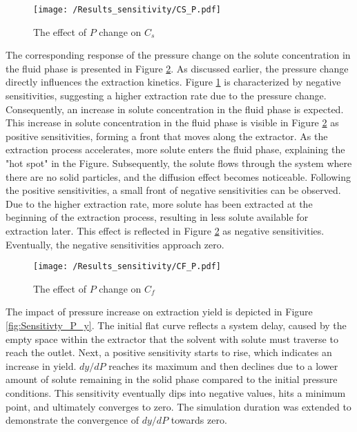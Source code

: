 \documentclass[../Article_Model_Parameters.tex]{subfiles}
\begin{document}
	\begin{figure}[h!]
		\centering
		\texttt{[image: /Results\_sensitivity/CS\_P.pdf]}
		\caption{The effect of $P$ change on $C_s$}
		\label{fig:Sensitivty_P_CS}
	\end{figure}

	The corresponding response of the pressure change on the solute concentration in the fluid phase is presented in Figure \ref{fig:Sensitivty_P_CF}. As discussed earlier, the pressure change directly influences the extraction kinetics. Figure \ref{fig:Sensitivty_P_CS} is characterized by negative sensitivities, suggesting a higher extraction rate due to the pressure change. Consequently, an increase in solute concentration in the fluid phase is expected. This increase in solute concentration in the fluid phase is visible in Figure \ref{fig:Sensitivty_P_CF} as positive sensitivities, forming a front that moves along the extractor. As the extraction process accelerates, more solute enters the fluid phase, explaining the "hot spot" in the Figure. Subsequently, the solute flows through the system where there are no solid particles, and the diffusion effect becomes noticeable. Following the positive sensitivities, a small front of negative sensitivities can be observed. Due to the higher extraction rate, more solute has been extracted at the beginning of the extraction process, resulting in less solute available for extraction later. This effect is reflected in Figure \ref{fig:Sensitivty_P_CF} as negative sensitivities. Eventually, the negative sensitivities approach zero.

	\begin{figure}[h!]
		\centering
		\texttt{[image: /Results\_sensitivity/CF\_P.pdf]}
		\caption{The effect of $P$ change on $C_f$}
		\label{fig:Sensitivty_P_CF}
	\end{figure}

	The impact of pressure increase on extraction yield is depicted in Figure \ref{fig:Sensitivty_P_y}. The initial flat curve reflects a system delay, caused by the empty space within the extractor that the solvent with solute must traverse to reach the outlet. Next, a positive sensitivity starts to rise, which indicates an increase in yield. $dy / dP$ reaches its maximum and then declines due to a lower amount of solute remaining in the solid phase compared to the initial pressure conditions. This sensitivity eventually dips into negative values, hits a minimum point, and ultimately converges to zero. The simulation duration was extended to demonstrate the convergence of $dy / dP$ towards zero.
\end{document}
